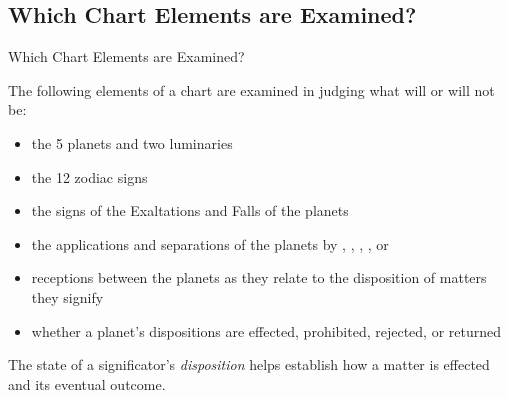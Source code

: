 \subsection{Which Chart Elements are Examined?}
\begin{frame}[t]{Which Chart Elements are Examined?}

The following elements of a chart are examined in judging what will or will not be:
\begin{itemize}
\item the 5 planets and two luminaries
\item the 12 zodiac signs
\item the signs of  the Exaltations and Falls of the planets
\item the applications and separations of the planets by \Conjunction, \Sextile, \Square, \Trine, or \Opposition\ 
\item receptions between the planets as they relate to the disposition of matters they signify
\item whether a planet's dispositions are effected, prohibited, rejected, or returned
\end{itemize}
\vspace{0.5cm}

The state of a significator's \textsl{disposition} helps establish how a matter is effected and its eventual outcome.
\end{frame}
